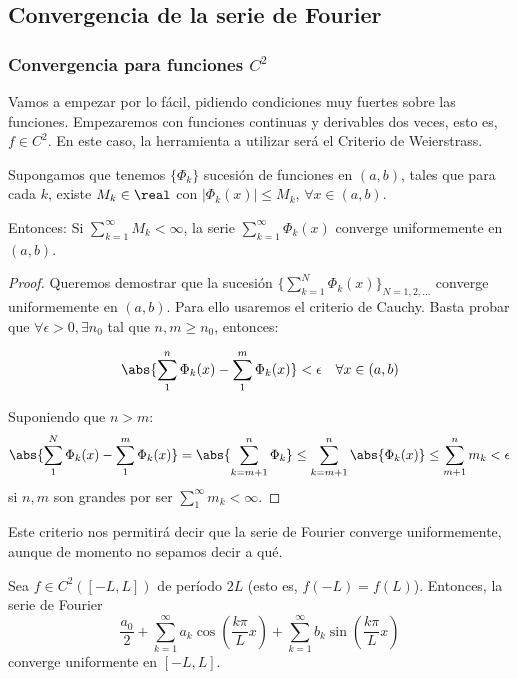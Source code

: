 	\subsection{Convergencia de la serie de Fourier}

		\subsubsection{Convergencia para funciones $C^2$}

		Vamos a empezar por lo fácil, pidiendo condiciones muy fuertes sobre las funciones. Empezaremos con funciones continuas y derivables dos veces, esto es, $f ∈ C^2$. En este caso, la herramienta a utilizar será el Criterio de Weierstrass.

		\begin{prop}\label{prop:criterio_Weierstrass} Supongamos que tenemos $\{\Phi_k\}$ sucesión de funciones en $(a,b)$, tales que para cada $k$, existe $M_k \in \real$ con $|\Phi_k(x)| \leq M_k$, $\forall x \in (a,b)$.

		Entonces: Si $\sum\limits_{k=1}^{\infty} M_k < \infty$, la serie $\sum\limits_{k=1}^{\infty} \Phi_k(x) $ converge uniformemente en $(a,b)$.
		\end{prop}

		\begin{proof}
			Queremos demostrar que la sucesión $\{\sum\limits_{k=1}^{N} \Phi_k(x)\}_{N=1,2,…} $ converge uniformemente en $(a,b)$. Para ello usaremos el criterio de Cauchy. Basta probar que $\forall \epsilon > 0, \exists n_0 $ tal que $n,m \geq n_0 $, entonces:

			\[ \abs{\sum^n_1 \Phi_k(x) - \sum^m_1 \Phi_k(x)} < \epsilon \quad \forall x \in (a,b) \]

			Suponiendo que $n > m$:
			\[ \abs{\sum^{N}_1 \Phi_k (x) - \sum^{m}_1 \Phi_k (x)} = \abs{\sum^n_{k=m+1} \Phi_k} \leq \sum^n_{k=m+1} \abs{\Phi_k (x)} \leq \sum_{m+1}^n m_k < \epsilon\]
			si $n,m$ son grandes por ser  $\sum\limits_{1}^{\infty} m_k < \infty $.
		\end{proof}

		Este criterio nos permitirá decir que la serie de Fourier converge uniformemente, aunque de momento no sepamos decir a qué.

		\begin{prop} Sea $f \in C^2 ([-L, L])$ de período $2L$ (esto es, $f(-L) = f(L)$). Entonces, la serie de Fourier \[ \frac{a_0}{2} + \sum_{k=1}^\infty a_k \cos \left( \frac{k \pi}{L} x \right) + \sum_{k=1}^\infty b_k \sin \left( \frac{k \pi}{L} x \right) \] converge uniformente en $[-L, L]$.
		\end{prop}

